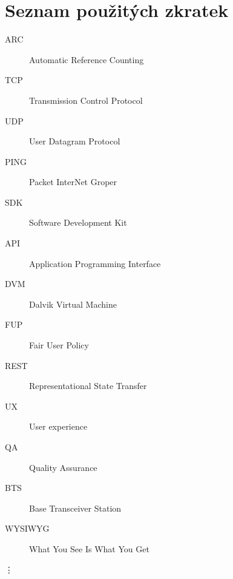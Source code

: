 \chapter{Seznam použitých zkratek}

\begin{description}
\item[ARC] Automatic Reference Counting
\item[TCP] Transmission Control Protocol
\item[UDP] User Datagram Protocol
\item[PING] Packet InterNet Groper
\item[SDK] Software Development Kit
\item[API] Application Programming Interface
\item[DVM] Dalvik Virtual Machine
\item[FUP] Fair User Policy
\item[REST] Representational State Transfer
\item[UX] User experience
\item[QA] Quality Assurance
\item[BTS] Base Transceiver Station
\item[WYSIWYG] What You See Is What You Get
\end{description}
\vdots